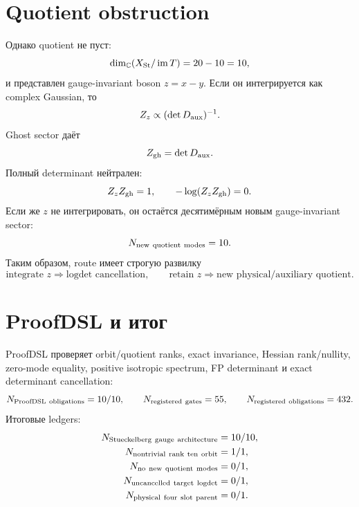 \section{Quotient obstruction}

Однако quotient не пуст:
\begin{equation}
 \dim_{\mathbb C}(X_{\rm St}/\operatorname{im}T)
 =20-10=10,
 \label{eq:v9-kms-stueckelberg-quotient-dimension}
\end{equation}
и представлен gauge-invariant boson $z=x-y$. Если он интегрируется как
complex Gaussian, то
\begin{equation}
 Z_z\propto(\det D_{\rm aux})^{-1}.
 \label{eq:v9-kms-stueckelberg-boson-factor}
\end{equation}
Ghost sector даёт
\begin{equation}
 Z_{\rm gh}=\det D_{\rm aux}.
 \label{eq:v9-kms-stueckelberg-ghost-factor}
\end{equation}
Полный determinant нейтрален:
\begin{equation}
 Z_zZ_{\rm gh}=1,
 \qquad
 -\log(Z_zZ_{\rm gh})=0.
 \label{eq:v9-kms-stueckelberg-cancellation}
\end{equation}
Если же $z$ не интегрировать, он остаётся десятимёрным новым
gauge-invariant sector:
\begin{equation}
 N_{\rm new\ quotient\ modes}=10.
 \label{eq:v9-kms-stueckelberg-new-modes}
\end{equation}
Таким образом, route имеет строгую развилку
\begin{equation}
 \text{integrate }z\Rightarrow\text{logdet cancellation},
 \qquad
 \text{retain }z\Rightarrow\text{new physical/auxiliary quotient}.
 \label{eq:v9-kms-stueckelberg-dichotomy}
\end{equation}

\section{ProofDSL и итог}

ProofDSL проверяет orbit/quotient ranks, exact invariance, Hessian
rank/nullity, zero-mode equality, positive isotropic spectrum, FP determinant
и exact determinant cancellation:
\begin{equation}
 N_{\rm ProofDSL\ obligations}=10/10,
 \qquad
 N_{\rm registered\ gates}=55,
 \qquad
 N_{\rm registered\ obligations}=432.
 \label{eq:v9-kms-stueckelberg-proofdsl}
\end{equation}
Итоговые ledgers:
\begin{equation}
 \begin{aligned}
 N_{\rm Stueckelberg\ gauge\ architecture}&=10/10,\\
 N_{\rm nontrivial\ rank\ ten\ orbit}&=1/1,\\
 N_{\rm no\ new\ quotient\ modes}&=0/1,\\
 N_{\rm uncancelled\ target\ logdet}&=0/1,\\
 N_{\rm physical\ four\ slot\ parent}&=0/1.
 \end{aligned}
 \label{eq:v9-kms-stueckelberg-final-ledger}
\end{equation}

